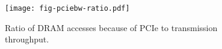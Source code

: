 \begin{figure}[t]
\texttt{[image: fig-pciebw-ratio.pdf]}
\caption{Ratio of DRAM accesses because of PCIe to transmission throughput.}
\label{fig:pciebw-ratio}
\end{figure}
